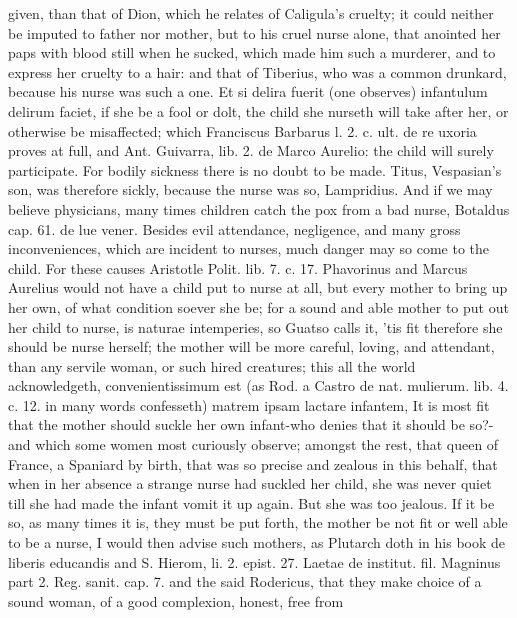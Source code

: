 {given, than that of Dion, which he relates of Caligula's cruelty;
it could neither be imputed to father nor mother, but to his cruel
nurse alone, that anointed her paps with blood still when he sucked,
which made him such a murderer, and to express her cruelty to a hair:
and that of Tiberius, who was a common drunkard, because his nurse was
such a one. Et si delira fuerit (one observes) infantulum delirum
faciet, if she be a fool or dolt, the child she nurseth will take after
her, or otherwise be misaffected; which Franciscus Barbarus l. 2. c.
ult. de re uxoria proves at full, and Ant. Guivarra, lib. 2. de Marco
Aurelio: the child will surely participate. For bodily sickness there
is no doubt to be made. Titus, Vespasian's son, was therefore sickly,
because the nurse was so, Lampridius. And if we may believe physicians,
many times children catch the pox from a bad nurse, Botaldus cap. 61.
de lue vener. Besides evil attendance, negligence, and many gross
inconveniences, which are incident to nurses, much danger may so come
to the child. For these causes Aristotle Polit. lib. 7. c. 17.
Phavorinus and Marcus Aurelius would not have a child put to nurse at
all, but every mother to bring up her own, of what condition soever she
be; for a sound and able mother to put out her child to nurse, is
naturae intemperies, so Guatso calls it, 'tis fit therefore she
should be nurse herself; the mother will be more careful, loving, and
attendant, than any servile woman, or such hired creatures; this all
the world acknowledgeth, convenientissimum est (as Rod. a Castro de
nat. mulierum. lib. 4. c. 12. in many words confesseth) matrem ipsam
lactare infantem, It is most fit that the mother should suckle her own
infant-who denies that it should be so?-and which some women most
curiously observe; amongst the rest, that queen of France, a
Spaniard by birth, that was so precise and zealous in this behalf, that
when in her absence a strange nurse had suckled her child, she was
never quiet till she had made the infant vomit it up again. But she was
too jealous. If it be so, as many times it is, they must be put forth,
the mother be not fit or well able to be a nurse, I would then advise
such mothers, as Plutarch doth in his book de liberis educandis
and S. Hierom, li. 2. epist. 27. Laetae de institut. fil.
Magninus part 2. Reg. sanit. cap. 7. and the said Rodericus, that they
make choice of a sound woman, of a good complexion, honest, free from
}
